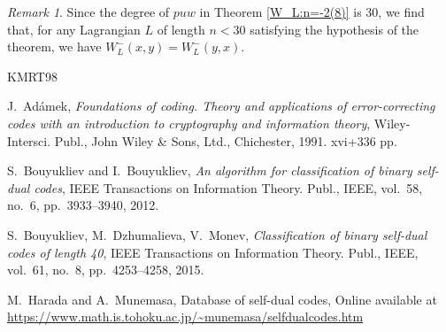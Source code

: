 \documentclass[a4paper,reqno]{amsart}
\theoremstyle{definition}
\theoremstyle{remark} \newtheorem{remark}[theorem]{Remark}
\numberwithin{equation}{section}
\begin{document}
\begin{remark}
    Since the degree of \(puw\) in Theorem \ref{W_L:n=-2(8)} is 30, we find that, for any Lagrangian \(L\) of length \(n < 30\) satisfying the hypothesis of the theorem, we have \(W_L^-(x,y) = W_L^-(y,x)\).
\end{remark}

\begin{thebibliography}{KMRT98}
	
 J.~Ad\'amek, \emph{Foundations of coding. Theory and applications of error-correcting codes with an introduction to cryptography and information theory}, Wiley-Intersci. Publ., John Wiley \& Sons, Ltd., Chichester, 1991. xvi+336 pp.

 S.~Bouyukliev and I.~Bouyukliev, \emph{An algorithm for classification of binary self-dual codes}, IEEE Transactions on Information Theory. Publ., IEEE, vol.~58, no.~6, pp.~3933--3940, 2012.

 S.~Bouyukliev, M.~Dzhumalieva, V.~Monev, \emph{Classification of binary self-dual codes of length 40}, IEEE Transactions on Information Theory. Publ., IEEE, vol.~61, no.~8, pp.~4253--4258, 2015.

 M.~Harada and A.~Munemasa, Database of self-dual codes, Online available at \url{https://www.math.is.tohoku.ac.jp/~munemasa/selfdualcodes.htm}







\end{thebibliography}
\end{document}
